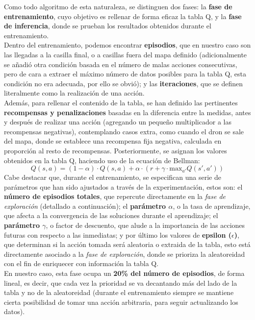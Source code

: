 Como todo algoritmo de esta naturaleza, se distinguen dos fases: la \textbf{fase de entrenamiento}, cuyo objetivo es rellenar de forma eficaz la tabla Q, y la \textbf{fase de inferencia}, donde se prueban los resultados obtenidos durante el entrenamiento.\\

Dentro del entrenamiento, podemos encontrar \textbf{episodios}, que en nuestro caso son las llegadas a la casilla final, o a casillas fuera del mapa definido (adicionalmente se añadió otra condición basada en el número de malas acciones consecutivas, pero de cara a extraer el máximo número de datos posibles para la tabla Q, esta condición no era adecuada, por ello se obvió); y las \textbf{iteraciones}, que se definen literalmente como la realización de una acción.\\

Además, para rellenar el contenido de la tabla, se han definido las pertinentes \textbf{recompensas y penalizaciones} basadas en la diferencia entre la medidas, antes y después de realizar una acción (agregando un pequeño multiplicador a las recompensas negativas), contemplando casos extra, como cuando el dron se sale del mapa, donde se establece una recompensa fija negativa, calculada en proporción al resto de recompensas. Posteriormente, se asignan los valores obtenidos en la tabla Q, haciendo uso de la ecuación de Bellman:
\begin{equation}
    Q(s, a) = (1 - \alpha) \cdot Q(s, a) + \alpha \cdot \left(r + \gamma \cdot \mathrm{max}_{a'} Q(s', a')\right)
\end{equation}
Cabe destacar que, durante el entrenamiento, se especifican una serie de parámetros que han sido ajustados a través de la experimentación, estos son: el \textbf{número de episodios totales}, que repercute directamente en la \emph{fase de exploración} (detallado a continuación); el \textbf{parámetro $\alpha$}, o la tasa de aprendizaje, que afecta a la convergencia de las soluciones durante el aprendizaje; el \textbf{parámetro $\gamma$}, o factor de descuento, que alude a la importancia de las acciones futuras con respecto a las inmediatas; y por último los valores de \textbf{epsilon ($\epsilon$)}, que determinan si la acción tomada será aleatoria o extraida de la tabla, esto está directamente asociado a la \emph{fase de exploración}, donde se prioriza la aleatoreidad con el fin de enriquecer con información la tabla Q.\\

En nuestro caso, esta fase ocupa un \textbf{20\% del número de episodios}, de forma lineal, es decir, que cada vez la prioridad se va decantando más del lado de la tabla y no de la aleatoreidad (durante el entrenamiento siempre se mantiene cierta posibilidad de tomar una acción arbitraria, para seguir actualizando los datos).\\

